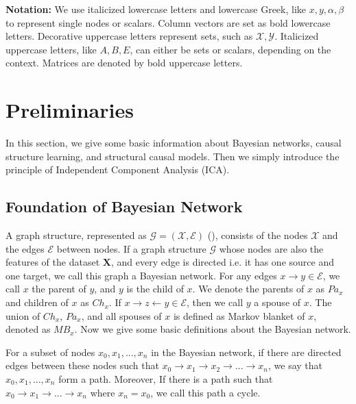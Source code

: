 \documentclass[twoside,11pt]{article}
\begin{document}
\textbf{Notation:} We use italicized lowercase letters and lowercase Greek, like $x, y, \alpha, \beta$ to represent single nodes or scalars. Column vectors are set as bold lowercase letters. Decorative uppercase letters represent sets, such as $\mathcal X, \mathcal Y$. Italicized uppercase letters, like $A, B, E$, can either be sets or scalars, depending on the context. Matrices are denoted by bold uppercase letters.
















\section{Preliminaries}
In this section, we give some basic information about Bayesian networks, causal structure learning, and structural causal models. Then we simply introduce the principle of Independent Component Analysis (ICA). 

\subsection{Foundation of Bayesian Network}
A graph structure, represented as $\mathcal G=(\mathcal X, \mathcal E)$ (\cite{koller2009probabilistic}), consists of the nodes $\mathcal X$ and the edges $\mathcal E$ between nodes.
If a graph structure $\mathcal G$ whose nodes are also the features of the dataset $\mathbf X$, and every edge is directed i.e. it has one source and one target, we call this graph a Bayesian network. For any edges $x \to y \in \mathcal E$, we call $x$ the parent of $y$, and $y$ is the child of $x$. We denote the parents of $x$ as $Pa_x$ and children of $x$ as $Ch_x$. If $x\to z\gets y\in\mathcal E$, then we call $y$ a spouse of $x$. The union of $Ch_x$, $Pa_x$, and all spouses of $x$ is defined as Markov blanket of $x$, denoted as $MB_x$.
Now we give some basic definitions about the Bayesian network.

\begin{definition}
For a subset of nodes $x_0, x_1, ..., x_n$ in the Bayesian network, if there are directed edges between these nodes such that $x_0\to x_1\to x_2\to ... \to x_n$, we say that $x_0, x_1, ..., x_n$ form a path. Moreover, If there is a path such that $x_0\to x_1\to ... \to x_n$ where $x_n=x_0$, we call this path a cycle.
\end{definition}
\end{document}

